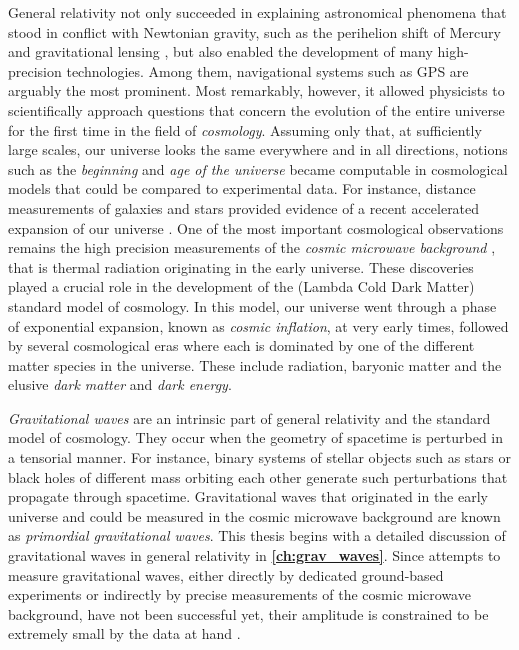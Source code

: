 General relativity not only succeeded in explaining astronomical phenomena that stood in conflict with Newtonian gravity, such as the perihelion shift of Mercury and gravitational lensing \autocite{Einstein1915Astro}, but also enabled the development of many high-precision technologies. Among them, navigational systems such as GPS are arguably the most prominent. Most remarkably, however, it allowed physicists to scientifically approach questions that concern the evolution of the entire universe for the first time in the field of \emph{cosmology}. Assuming only that, at sufficiently large scales, our universe looks the same everywhere and in all directions, notions such as the \emph{beginning} and \emph{age of the universe} became computable in cosmological models that could be compared to experimental data. For instance, distance measurements of galaxies and stars provided evidence of a recent accelerated expansion of our universe \autocite{Perlmutter2003}. One of the most important cosmological observations remains the high precision measurements of the \emph{cosmic microwave background} \autocite{Penzias1965,Planck2015}, that is thermal radiation originating in the early universe. These discoveries played a crucial role in the development of the \LCDM{} (Lambda Cold Dark Matter) standard model of cosmology. In this model, our universe went through a phase of exponential expansion, known as \emph{cosmic inflation}, at very early times, followed by several cosmological eras where each is dominated by one of the different matter species in the universe. These include radiation, baryonic matter and the elusive \emph{dark matter} and \emph{dark energy}.

\emph{Gravitational waves} are an intrinsic part of general relativity and the standard model of cosmology. They occur when the geometry of spacetime is perturbed in a tensorial manner. For instance, binary systems of stellar objects such as stars or black holes of different mass orbiting each other generate such perturbations that propagate through spacetime. Gravitational waves that originated in the early universe and could be measured in the cosmic microwave background are known as \emph{primordial gravitational waves}. This thesis begins with a detailed discussion of gravitational waves in general relativity in \textbf{\autoref{ch:grav_waves}}. Since attempts to measure gravitational waves, either directly by dedicated ground-based experiments or indirectly by precise measurements of the cosmic microwave background, have not been successful yet, their amplitude is constrained to be extremely small by the data at hand \autocite{LIGO2009,Planck2015}.

